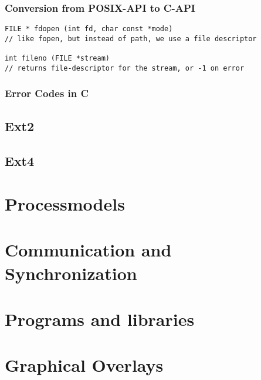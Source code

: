 \documentclass[main.tex,fontsize=8pt,paper=a4,paper=portrait,DIV=calc,]{scrartcl}
\begin{document}
\subsubsection{Conversion from POSIX-API to C-API}
\begin{lstlisting}
FILE * fdopen (int fd, char const *mode)
// like fopen, but instead of path, we use a file descriptor

int fileno (FILE *stream)
// returns file-descriptor for the stream, or -1 on error
\end{lstlisting}

\subsubsection{Error Codes in C}


\subsection{Ext2}

\subsection{Ext4}

\section{Processmodels}

\section{Communication and Synchronization}

\section{Programs and libraries}

\section{Graphical Overlays}
\end{document}
